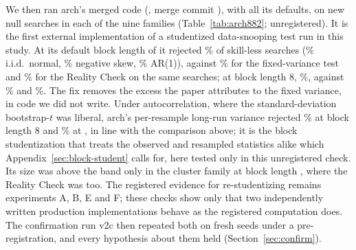 We then ran arch's merged code (, merge commit ), with all its defaults, on  new null searches in each of the nine families (Table~\ref{tab:arch882}; unregistered). It is the first external implementation of a studentized data-snooping test run in this study. At its default block length of  it rejected \% of skill-less searches (\% i.i.d.\ normal, \% negative skew, \% AR(1)), against \% for the fixed-variance test and \% for the Reality Check on the same searches; at block length 8, \%, against \% and \%. The fix removes the excess the paper attributes to the fixed variance, in code we did not write. Under autocorrelation, where the standard-deviation bootstrap-$t$ was liberal, arch's per-resample long-run variance rejected \% at block length 8 and \% at , in line with the comparison above; it is the block studentization that treats the observed and resampled statistics alike which Appendix~\ref{sec:block-student} calls for, here tested only in this unregistered check. Its size was above the band only in the cluster family at block length , where the Reality Check was too. The registered evidence for re-studentizing remains experiments A, B, E and F; these checks show only that two independently written production implementations behave as the registered computation does. The confirmation run v2c then repeated both on fresh seeds under a pre-registration, and every hypothesis about them held (Section~\ref{sec:confirm}).

